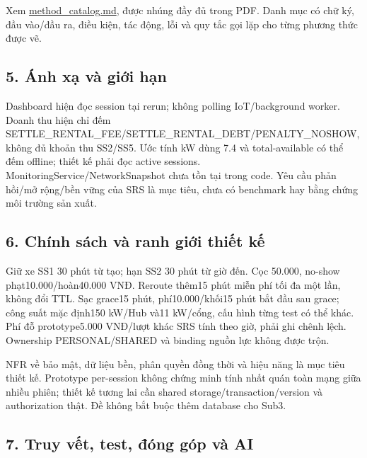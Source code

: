 \documentclass[11pt,a4paper]{article}
\begin{document}
Xem \url{method_catalog.md}, được nhúng đầy đủ trong PDF. Danh mục có
chữ ký, đầu vào/đầu ra, điều kiện, tác động, lỗi và quy tắc gọi lặp cho
từng phương thức được vẽ.

\hypertarget{uxe1nh-xux1ea1-vuxe0-giux1edbi-hux1ea1n}{%
\subsection{5. Ánh xạ và giới
hạn}\label{uxe1nh-xux1ea1-vuxe0-giux1edbi-hux1ea1n}}

Dashboard hiện đọc session tại rerun; không polling IoT/background
worker. Doanh thu hiện chỉ đếm
SETTLE\_RENTAL\_FEE/SETTLE\_RENTAL\_DEBT/PENALTY\_NOSHOW, không đủ khoản
thu SS2/SS5. Ước tính kW dùng 7.4 và total-available có thể đếm offline;
thiết kế phải đọc active sessions. MonitoringService/NetworkSnapshot
chưa tồn tại trong code. Yêu cầu phản hồi/mở rộng/bền vững của SRS là
mục tiêu, chưa có benchmark hay bằng chứng môi trường sản xuất.

\hypertarget{chuxednh-suxe1ch-vuxe0-ranh-giux1edbi-thiux1ebft-kux1ebf}{%
\subsection{6. Chính sách và ranh giới thiết
kế}\label{chuxednh-suxe1ch-vuxe0-ranh-giux1edbi-thiux1ebft-kux1ebf}}

Giữ xe SS1 30 phút từ tạo; hạn SS2 30 phút từ giờ đến. Cọc 50.000,
no-show phạt10.000/hoàn40.000 VNĐ. Reroute thêm15 phút miễn phí tối đa
một lần, không đổi TTL. Sạc grace15 phút, phí10.000/khối15 phút bắt đầu
sau grace; công suất mặc định150 kW/Hub và11 kW/cổng, cấu hình từng test
có thể khác. Phí đỗ prototype5.000 VNĐ/lượt khác SRS tính theo giờ, phải
ghi chênh lệch. Ownership PERSONAL/SHARED và binding nguồn lực không
được trộn.

NFR về bảo mật, dữ liệu bền, phân quyền đồng thời và hiệu năng là mục
tiêu thiết kế. Prototype per-session không chứng minh tính nhất quán
toàn mạng giữa nhiều phiên; thiết kế tương lai cần shared
storage/transaction/version và authorization thật. Đề không bắt buộc
thêm database cho Sub3.

\hypertarget{truy-vux1ebft-test-ux111uxf3ng-guxf3p-vuxe0-ai}{%
\subsection{7. Truy vết, test, đóng góp và
AI}\label{truy-vux1ebft-test-ux111uxf3ng-guxf3p-vuxe0-ai}}

\newpage
\end{document}
